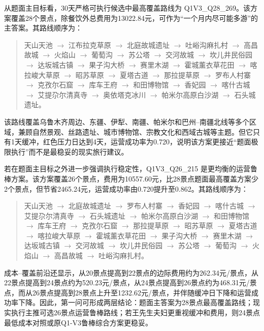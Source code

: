 \documentclass[UTF8,zihao=-4,a4paper]{ctexart}
\begin{document}
从题面主目标看，30天严格可执行候选中最高覆盖路线为 Q1V3\_Q28\_269。该方案覆盖28个景点，除餐饮外总费用为13022.84元，可作为“一个月内尽可能多游”的主答案。其路线顺序为：
\begin{quote}
\small
天山天池 $\rightarrow$ 江布拉克草原 $\rightarrow$ 北庭故城遗址 $\rightarrow$ 吐峪沟麻扎村 $\rightarrow$ 高昌故城 $\rightarrow$ 火焰山 $\rightarrow$ 葡萄沟 $\rightarrow$ 苏公塔 $\rightarrow$ 交河故城 $\rightarrow$ 坎儿井民俗园 $\rightarrow$ 达坂城古镇 $\rightarrow$ 果子沟大桥 $\rightarrow$ 赛里木湖 $\rightarrow$ 霍城薰衣草花田 $\rightarrow$ 喀拉峻大草原 $\rightarrow$ 昭苏草原 $\rightarrow$ 夏塔古道 $\rightarrow$ 那拉提草原 $\rightarrow$ 罗布人村寨 $\rightarrow$ 克孜尔石窟 $\rightarrow$ 库车王府 $\rightarrow$ 和田博物馆 $\rightarrow$ 香妃园 $\rightarrow$ 喀什古城 $\rightarrow$ 艾提尕尔清真寺 $\rightarrow$ 奥依塔克冰川 $\rightarrow$ 帕米尔高原白沙湖 $\rightarrow$ 石头城遗址。
\end{quote}

该路线覆盖乌鲁木齐周边、东疆、伊犁、南疆、帕米尔和巴州--南疆北线等多个区域，兼顾自然景观、丝路遗址、城市博物馆、宗教文化和西域古城等主题。但它只有1天缓冲，红色压力日达到4天，运营成功率为0.720，说明该方案更接近“题面极限执行”而不是最稳妥的现实旅行建议。

若在题面主目标之外进一步强调执行稳定性，Q1V3\_Q26\_215 是更均衡的运营鲁棒方案。该方案覆盖26个景点，费用为10557.60元，比28景点题面最高覆盖方案少2个景点，但节省2465.24元，运营成功率由0.720提升至0.862。其路线顺序为：
\begin{quote}
\small
天山天池 $\rightarrow$ 北庭故城遗址 $\rightarrow$ 罗布人村寨 $\rightarrow$ 香妃园 $\rightarrow$ 喀什古城 $\rightarrow$ 艾提尕尔清真寺 $\rightarrow$ 石头城遗址 $\rightarrow$ 帕米尔高原白沙湖 $\rightarrow$ 和田博物馆 $\rightarrow$ 库车王府 $\rightarrow$ 克孜尔石窟 $\rightarrow$ 那拉提草原 $\rightarrow$ 昭苏草原 $\rightarrow$ 夏塔古道 $\rightarrow$ 喀拉峻大草原 $\rightarrow$ 霍城薰衣草花田 $\rightarrow$ 果子沟大桥 $\rightarrow$ 赛里木湖 $\rightarrow$ 达坂城古镇 $\rightarrow$ 交河故城 $\rightarrow$ 坎儿井民俗园 $\rightarrow$ 苏公塔 $\rightarrow$ 葡萄沟 $\rightarrow$ 火焰山 $\rightarrow$ 高昌故城 $\rightarrow$ 吐峪沟麻扎村。
\end{quote}

成本--覆盖前沿还显示，从20景点提高到22景点的边际费用约为262.34元/景点，从22景点提高到24景点约为520.23元/景点，从24景点提高到26景点约为468.31元/景点，而从26景点提高到28景点上升至1232.62元/景点，并伴随缓冲日下降和运营成功率下降。因此，第一问可形成两层结论：题面主答案为28景点最高覆盖路线；现实执行主推可选26景点运营鲁棒路线；若王先生夫妇更重视缓冲和费用，则24景点最低成本对照或原Q1-V3鲁棒综合方案更稳妥。
\end{document}
